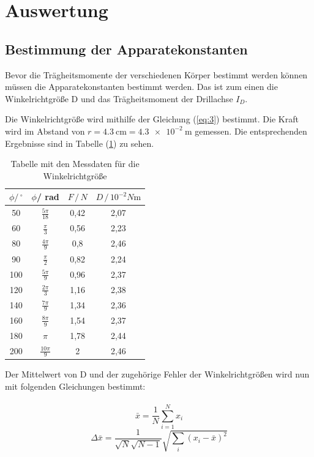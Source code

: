 \section{Auswertung}
\subsection{Bestimmung der Apparatekonstanten}

Bevor die Trägheitsmomente der verschiedenen Körper bestimmt werden können müssen die
Apparatekonstanten bestimmt werden. Das ist zum einen die Winkelrichtgröße D und
das Trägheitsmoment der Drillachse $I_D$.

Die Winkelrichtgröße wird mithilfe der Gleichung (\ref{eq:3}) bestimmt. Die Kraft wird im Abstand
von $r = \SI{4.3}{\centi\meter} = \SI{4.3e-2}{\meter}$ gemessen.
Die entsprechenden Ergebnisse sind in Tabelle (\ref{fig:tab1}) zu sehen.

\begin{table}[H]
  \centering
  \caption{Tabelle mit den Messdaten für die Winkelrichtgröße}
  \begin{tabular}{c c c c}
    \toprule
    $\phi / \, ^\circ $ & $\phi$/ rad & $F \, / \, N$ &
    $D \, / \, 10^{-2} N \si{\meter}$ \\
    \midrule
    50 &  $\frac{5\pi}{18}$ & 0,42 & 2,07 \\
    60 &  $\frac{\pi}{3}$ & 0,56 & 2,23 \\
    80 &  $\frac{4\pi}{9}$ & 0,8 & 2,46 \\
    90 &  $\frac{\pi}{2} $ & 0,82 & 2,24 \\
    100 & $\frac{5\pi}{9}$ & 0,96 & 2,37 \\
    120 & $\frac{2\pi}{3}$ & 1,16 & 2,38 \\
    140 & $\frac{7\pi}{9}$ & 1,34 & 2,36 \\
    160 & $\frac{8\pi}{9}$ & 1,54 & 2,37 \\
    180 & $\pi           $ & 1,78 & 2,44 \\
    200 & $\frac{10\pi}{9}$ &   2 & 2,46 \\
    \bottomrule
  \end{tabular}
  \label{fig:tab1}
\end{table}

Der Mittelwert von D und der zugehörige Fehler der Winkelrichtgrößen wird nun mit
folgenden Gleichungen bestimmt:\\\\
\begin{equation}
    \bar{x} = \frac{1}{N} \sum_{i=1}^{N} x_i
    \label{eq:4}
\end{equation}
\begin{equation}
  \Delta \bar{x} = \frac{1}{\sqrt{N}\sqrt{N-1}} \sqrt{\sum_{i}(x_i-\bar{x})^2}
  \label{eq:5}
\end{equation}

